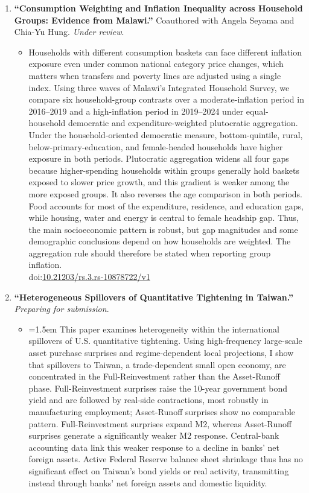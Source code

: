 \documentclass{article}
\begin{document}
\begin{enumerate}
    \item \textbf{“Consumption Weighting and Inflation Inequality across Household Groups: Evidence from Malawi.”} Coauthored with Angela Seyama and Chia-Yu Hung. \textit{Under review}.
    \begin{itemize}
        \item[] Households with different consumption baskets can face different inflation exposure even under common national category price changes, which matters when transfers and poverty lines are adjusted using a single index. Using three waves of Malawi's Integrated Household Survey, we compare six household-group contrasts over a moderate-inflation period in 2016--2019 and a high-inflation period in 2019--2024 under equal-household democratic and expenditure-weighted plutocratic aggregation. Under the household-oriented democratic measure, bottom-quintile, rural, below-primary-education, and female-headed households have higher exposure in both periods. Plutocratic aggregation widens all four gaps because higher-spending households within groups generally hold baskets exposed to slower price growth, and this gradient is weaker among the more exposed groups. It also reverses the age comparison in both periods. Food accounts for most of the expenditure, residence, and education gaps, while housing, water and energy is central to female headship gap. Thus, the main socioeconomic pattern is robust, but gap magnitudes and some demographic conclusions depend on how households are weighted. The aggregation rule should therefore be stated when reporting group inflation.\\ doi:\href{https://doi.org/10.21203/rs.3.rs-10878722/v1}{10.21203/rs.3.rs-10878722/v1}
    \end{itemize}
    \item \textbf{“Heterogeneous Spillovers of Quantitative Tightening in Taiwan.”} \textit{Preparing for submission}.
    \begin{itemize}
        \item[] \emergencystretch=1.5em This paper examines heterogeneity within the international spillovers of U.S. quantitative tightening. Using high-frequency large-scale asset purchase surprises and regime-dependent local projections, I show that spillovers to Taiwan, a trade-dependent small open economy, are concentrated in the Full-Reinvestment rather than the Asset-Runoff phase. Full-Reinvestment surprises raise the 10-year government bond yield and are followed by real-side contractions, most robustly in manufacturing employment; Asset-Runoff surprises show no comparable pattern. Full-Reinvestment surprises expand M2, whereas Asset-Runoff surprises generate a significantly weaker M2 response. Central-bank accounting data link this weaker response to a decline in banks' net foreign assets. Active Federal Reserve balance sheet shrinkage thus has no significant effect on Taiwan's bond yields or real activity, transmitting instead through banks' net foreign assets and domestic liquidity.

\end{itemize}
\end{enumerate}
\end{document}
